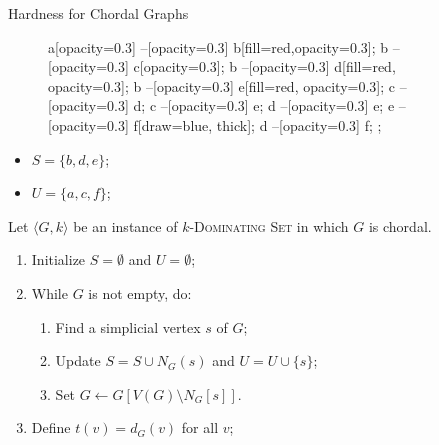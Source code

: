 \documentclass[10pt,aspectratio=169,english]{beamer}
\begin{document}
\begin{frame}{Hardness for Chordal Graphs}
\begin{minipage}[c]{0.50\textwidth}
{\begin{figure}
{					a[opacity=0.3] --[opacity=0.3] b[fill=red,opacity=0.3];
					b --[opacity=0.3] c[opacity=0.3];
					b --[opacity=0.3] d[fill=red, opacity=0.3];
					b --[opacity=0.3] e[fill=red, opacity=0.3];
					c --[opacity=0.3] d;
					c --[opacity=0.3] e;
					d --[opacity=0.3] e;
					e --[opacity=0.3] f[draw=blue, thick];
					d --[opacity=0.3] f;
				};		
			\end{figure}
			\begin{itemize}
				\item $S = \{b, d, e\}$;
				\item $U = \{a, c, f\}$;
			\end{itemize}
		}
	\end{minipage}\begin{minipage}[c]{0.50\textwidth}
		Let $\langle G, k \rangle$ be an instance of \textsc{$k$-Dominating Set} in which $G$ is chordal.
		\begin{enumerate}
			\item Initialize $S = \emptyset$ and $U = \emptyset$;
			\item While $G$ is not empty, do:
			\begin{enumerate}
				\item Find a simplicial vertex $s$ of $G$;
				\item Update $S = S \cup N_G(s)$ and $U = U \cup \{s\}$;
				\item Set $G \gets G[V(G) \setminus N_G[s]]$.
			\end{enumerate}
			
			\item Define $t(v) = d_G(v)$ for all $v$;
		\end{enumerate}
	\end{minipage}
	
\end{frame}
\end{document}
